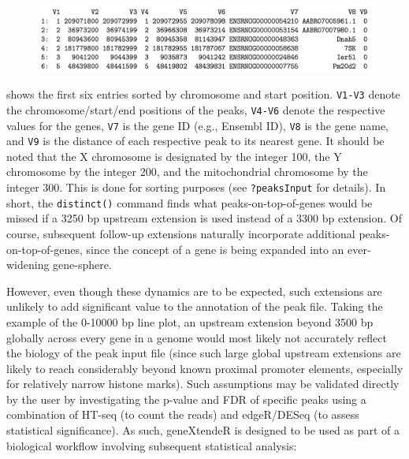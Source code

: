 \documentclass[12pt]{article}
\begin{document}
\begin{figure}[H]
\centering
\includegraphics{figures/table1.png}
\end{figure}

shows the first six entries sorted by chromosome and start position.  \texttt{V1-V3} denote the chromosome/start/end positions of the peaks, \texttt{V4-V6} denote the respective values for the genes, \texttt{V7} is the gene ID (e.g., Ensembl ID), \texttt{V8} is the gene name, and \texttt{V9} is the distance of each respective peak to its nearest gene.  It should be noted that the X chromosome is designated by the integer 100, the Y chromosome by the integer 200, and the mitochondrial chromosome by the integer 300.  This is done for sorting purposes (see \texttt{?peaksInput} for details).  In short, the \texttt{distinct()} command finds what peaks-on-top-of-genes would be missed if a 3250 bp upstream extension is used instead of a 3300 bp extension.  Of course, subsequent follow-up extensions naturally incorporate additional peaks-on-top-of-genes, since the concept of a gene is being expanded into an ever-widening gene-sphere.  

However, even though these dynamics are to be expected, such extensions are unlikely to add significant value to the annotation of the peak file.  Taking the example of the 0-10000 bp line plot, an upstream extension beyond 3500 bp globally across every gene in a genome would most likely not accurately reflect the biology of the peak input file (since such large global upstream extensions are likely to reach considerably beyond known proximal promoter elements, especially for relatively narrow histone marks).  Such assumptions may be validated directly by the user by investigating the p-value and FDR of specific peaks using a combination of HT-seq (to count the reads) and edgeR/DESeq (to assess statistical significance).  As such, geneXtendeR is designed to be used as part of a biological workflow involving subsequent statistical analysis:
\end{document}
